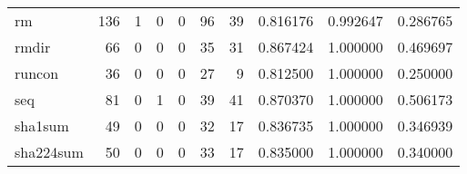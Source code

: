 \begin{tabular}{lrrrrrrrrr}
rm        &                                       136 &                                                  1 &                                                  0 &                                                  0 &                                                 96 &                                                 39 &                                           0.816176 &                               0.992647 &                             0.286765 \\
rmdir     &                                        66 &                                                  0 &                                                  0 &                                                  0 &                                                 35 &                                                 31 &                                           0.867424 &                               1.000000 &                             0.469697 \\
runcon    &                                        36 &                                                  0 &                                                  0 &                                                  0 &                                                 27 &                                                  9 &                                           0.812500 &                               1.000000 &                             0.250000 \\
seq       &                                        81 &                                                  0 &                                                  1 &                                                  0 &                                                 39 &                                                 41 &                                           0.870370 &                               1.000000 &                             0.506173 \\
sha1sum   &                                        49 &                                                  0 &                                                  0 &                                                  0 &                                                 32 &                                                 17 &                                           0.836735 &                               1.000000 &                             0.346939 \\
sha224sum &                                        50 &                                                  0 &                                                  0 &                                                  0 &                                                 33 &                                                 17 &                                           0.835000 &                               1.000000 &                             0.340000 \\

\end{tabular}
